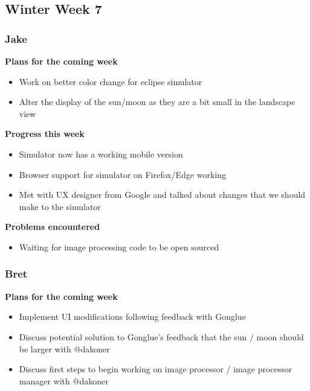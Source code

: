 \documentclass[10pt, onecolumn, draftclsnofoot, letterpaper, compsoc]{IEEEtran}
\begin{document}
\subsection{Winter Week 7}

    \subsubsection{Jake}

    \noindent \textbf{Plans for the coming week}

    \begin{itemize}

    \item Work on better color change for eclipse simulator
    \item Alter the display of the sun/moon as they are a bit small in the landscape view

    \end{itemize}

    \noindent \textbf{Progress this week}

    \begin{itemize}

    \item Simulator now has a working mobile version
    \item Browser support for simulator on Firefox/Edge working
    \item Met with UX designer from Google and talked about changes that we should make to the simulator

    \end{itemize}

    \noindent \textbf{Problems encountered}

    \begin{itemize}

    \item Waiting for image processing code to be open sourced

    \end{itemize}

    \subsubsection{Bret}

    \noindent \textbf{Plans for the coming week}

    \begin{itemize}

    \item Implement UI modifications following feedback with Gonglue
      \item Discuss potential solution to Gonglue's feedback that the sun / moon should be larger with @dakoner
    \item Discuss first steps to begin working on image processor / image processor manager with @dakoner

    \end{itemize}
\end{document}
